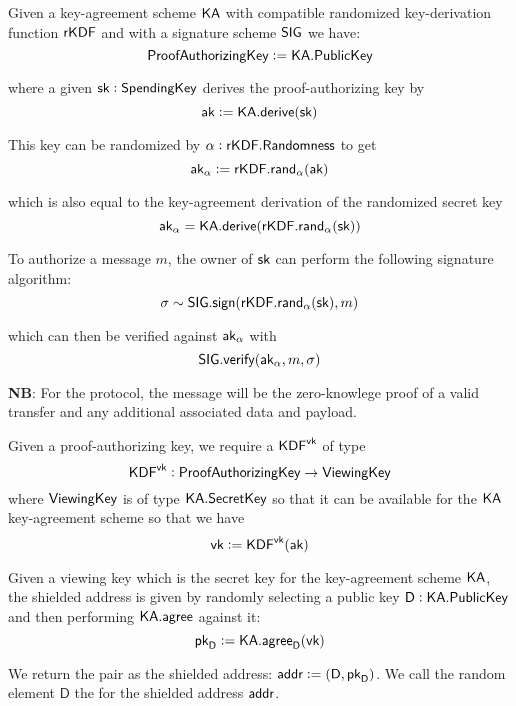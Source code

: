 \begin{definition}
    Given a key-agreement scheme ${\textsf{KA}}$ with compatible randomized key-derivation function ${\textsf{rKDF}}$ and with a signature scheme ${\textsf{SIG}}$ we have:
    \[{\textsf{ProofAuthorizingKey}} := {\textsf{KA}}.{\textsf{PublicKey}}\]

    where a given ${\textsf{sk}} : {\textsf{SpendingKey}}$ derives the proof-authorizing key by
    \[{\textsf{ak}} := {\textsf{KA}}.{\textsf{derive}}({\textsf{sk}})\]

    This key can be randomized by $\alpha : {\textsf{rKDF}}.{\textsf{Randomness}}$ to get
    \[{\textsf{ak}}_\alpha := {\textsf{rKDF}}.{\textsf{rand}}_\alpha({\textsf{ak}})\]

    which is also equal to the key-agreement derivation of the randomized secret key
    \[{\textsf{ak}}_\alpha = {\textsf{KA}}.{\textsf{derive}}({\textsf{rKDF}}.{\textsf{rand}}_\alpha({\textsf{sk}}))\]

    To authorize a message $m$, the owner of ${\textsf{sk}}$ can perform the following signature algorithm:
    \[\sigma \sim {\textsf{SIG}}.{\textsf{sign}}({\textsf{rKDF}}.{\textsf{rand}}_\alpha({\textsf{sk}}), m)\]

    which can then be verified against ${\textsf{ak}}_\alpha$ with
    \[{\textsf{SIG}}.{\textsf{verify}}({\textsf{ak}}_\alpha, m, \sigma)\]

    \textbf{NB}: For the \Transfer{} protocol, the message will be the zero-knowlege proof of a valid transfer and any additional associated data and \Ledger{} payload.
\end{definition}

\begin{definition}
    Given a proof-authorizing key, we require a ${\textsf{KDF}}^{\textsf{vk}}$ of type
    \[{\textsf{KDF}}^{\textsf{vk}} : {\textsf{ProofAuthorizingKey}} \to {\textsf{ViewingKey}}\]
    where ${\textsf{ViewingKey}}$ is of type ${\textsf{KA}}.{\textsf{SecretKey}}$ so that it can be available for the ${\textsf{KA}}$ key-agreement scheme so that we have
    \[{\textsf{vk}} := {\textsf{KDF}}^{\textsf{vk}}({\textsf{ak}})\]
\end{definition}

\begin{definition}
    Given a viewing key which is the secret key for the key-agreement scheme ${\textsf{KA}}$, the shielded address is given by randomly selecting a public key $\textsf{D} : {\textsf{KA}}.{\textsf{PublicKey}}$ and then performing ${\textsf{KA}}.{\textsf{agree}}$ against it:
    \[{\textsf{pk}}_\textsf{D} := {\textsf{KA}}.{\textsf{agree}}_\textsf{D}({\textsf{vk}})\]

    We return the pair as the shielded address: ${\textsf{addr}} := (\textsf{D}, {\textsf{pk}}_\textsf{D})$. We call the random element $\textsf{D}$ the \Diversifier{} for the shielded address ${\textsf{addr}}$.
\end{definition}


